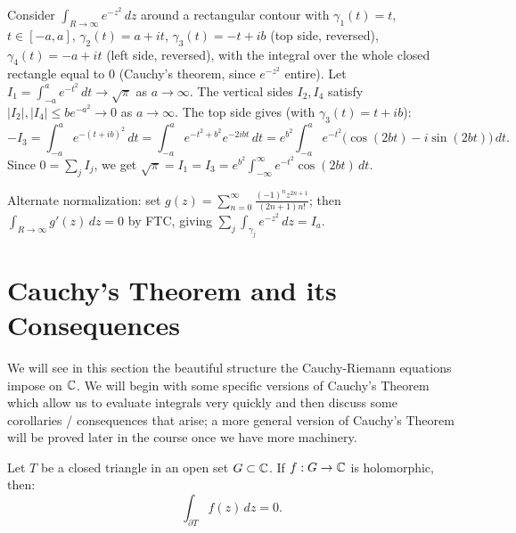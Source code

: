\documentclass[11pt]{article}
\begin{document}
\begin{example}
Consider $\int_{R\to\infty} e^{-z^2}\,dz$ around a rectangular contour with $\gamma_1(t) = t$, $t \in [-a,a]$, $\gamma_2(t) = a+it$, $\gamma_3(t) = -t+ib$ (top side, reversed), $\gamma_4(t) = -a+it$ (left side, reversed), with the integral over the whole closed rectangle equal to $0$ (Cauchy's theorem, since $e^{-z^2}$ entire). Let $I_1 = \int_{-a}^a e^{-t^2}\,dt \to \sqrt\pi$ as $a\to\infty$. The vertical sides $I_2,I_4$ satisfy $|I_2|,|I_4| \le be^{-a^2} \to 0$ as $a\to\infty$. The top side gives (with $\gamma_3(t) = t+ib$):
\[
-I_3 = \int_{-a}^a e^{-(t+ib)^2}\,dt = \int_{-a}^a e^{-t^2+b^2}e^{-2ibt}\,dt = e^{b^2}\int_{-a}^a e^{-t^2}\big(\cos(2bt) - i\sin(2bt)\big)\,dt.
\]
Since $0 = \sum_j I_j$, we get $\sqrt\pi = I_1 = I_3 = e^{b^2}\int_{-\infty}^\infty e^{-t^2}\cos(2bt)\,dt$.

Alternate normalization: set $g(z) = \sum_{n=0}^\infty \frac{(-1)^nz^{2n+1}}{(2n+1)n!}$; then $\int_{R\to\infty} g'(z)\,dz = 0$ by FTC, giving $\sum_j \int_{\gamma_j} e^{-z^2}\,dz = I_a$.
\end{example}

\newpage
\section{Cauchy's Theorem and its Consequences}

We will see in this section the beautiful structure the Cauchy-Riemann equations impose on ${\mathbb{C}}$. We will begin with some specific versions of Cauchy's Theorem which allow us to evaluate integrals very quickly and then discuss some corollaries / consequences that arise; a more general version of Cauchy's Theorem will be proved later in the course once we have more machinery.

\begin{theorem}
Let $T$ be a closed triangle in an open set $G \subset {\mathbb{C}}$. If $f: G \to {\mathbb{C}}$ is holomorphic, then:
\[
\int_{\partial T} f(z) \, dz = 0.
\]
\end{theorem}
\end{document}
